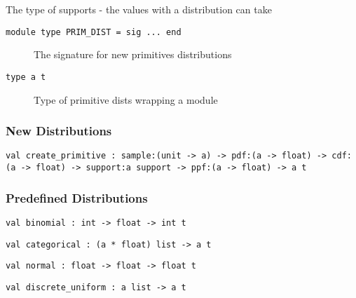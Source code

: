 The type of supports - the values with a distribution can take

\begin{description}
\item[{\protect\hyperlink{module-type-PRIMux5fDIST}{}\texttt{module\ type\ PRIM\_DIST\ =\ sig\ ...\ end}}]
The signature for new primitives distributions
\end{description}

\begin{description}
\item[{\protect\hyperlink{type-t}{}\texttt{type\ \textquotesingle{}a\ t}}]
Type of primitive dists wrapping a module
\end{description}

\hypertarget{newux5fprim}{\subsubsection{\texorpdfstring{\protect\hyperlink{newux5fprim}{}New
Distributions}{New Distributions}}\label{newux5fprim}}

\protect\hyperlink{val-createux5fprimitive}{}\texttt{val\ create\_primitive\ :\ sample:(unit\ -\textgreater{}\ \textquotesingle{}a)\ -\textgreater{}\ pdf:(\textquotesingle{}a\ -\textgreater{}\ float)\ -\textgreater{}\ cdf:(\textquotesingle{}a\ -\textgreater{}\ float)\ -\textgreater{}\ support:\textquotesingle{}a\ support\ -\textgreater{}\ ppf:(\textquotesingle{}a\ -\textgreater{}\ float)\ -\textgreater{}\ \textquotesingle{}a\ t}

\hypertarget{inbuiltux5fdists}{\subsubsection{\texorpdfstring{\protect\hyperlink{inbuiltux5fdists}{}Predefined
Distributions}{Predefined Distributions}}\label{inbuiltux5fdists}}

\protect\hyperlink{val-binomial}{}\texttt{val\ binomial\ :\ int\ -\textgreater{}\ float\ -\textgreater{}\ int\ t}

\protect\hyperlink{val-categorical}{}\texttt{val\ categorical\ :\ (\textquotesingle{}a\ *\ float)\ list\ -\textgreater{}\ \textquotesingle{}a\ t}

\protect\hyperlink{val-normal}{}\texttt{val\ normal\ :\ float\ -\textgreater{}\ float\ -\textgreater{}\ float\ t}

\protect\hyperlink{val-discreteux5funiform}{}\texttt{val\ discrete\_uniform\ :\ \textquotesingle{}a\ list\ -\textgreater{}\ \textquotesingle{}a\ t}

